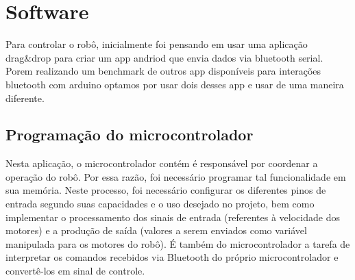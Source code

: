 



\section{Software}
Para controlar o robô, inicialmente foi pensando em usar uma aplicação drag\&drop para criar um app andriod que envia dados via bluetooth serial.
Porem realizando um benchmark de outros app disponíveis para interações bluetooth com arduino optamos por usar dois desses app e usar de uma maneira diferente.


\subsection{Programação do microcontrolador}

Nesta aplicação, o microcontrolador contém é responsável por coordenar a operação do robô. Por essa razão, foi
necessário programar tal funcionalidade em sua memória. Neste processo, foi necessário configurar os diferentes pinos de
entrada segundo suas capacidades e o uso desejado no projeto, bem como implementar o processamento dos sinais de entrada
(referentes à velocidade dos motores) e a produção de saída (valores a serem enviados como variável manipulada para os
motores do robô). É também do microcontrolador a tarefa de interpretar os comandos recebidos via Bluetooth do próprio microcontrolador
e convertê-los em sinal de controle.

